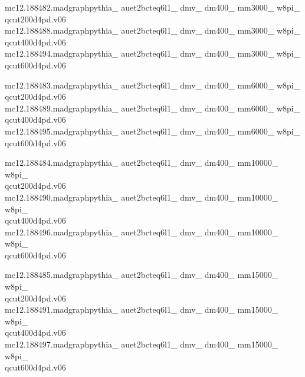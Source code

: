 mc12.188482.madgraphpythia\_ auet2bcteq6l1\_ dmv\_ dm400\_ mm3000\_ w8pi\_ \\ qcut200d4pd.v06\\
mc12.188488.madgraphpythia\_ auet2bcteq6l1\_ dmv\_ dm400\_ mm3000\_ w8pi\_ \\ qcut400d4pd.v06\\
mc12.188494.madgraphpythia\_ auet2bcteq6l1\_ dmv\_ dm400\_ mm3000\_ w8pi\_ \\ qcut600d4pd.v06

mc12.188483.madgraphpythia\_ auet2bcteq6l1\_ dmv\_ dm400\_ mm6000\_ w8pi\_ \\ qcut200d4pd.v06\\
mc12.188489.madgraphpythia\_ auet2bcteq6l1\_ dmv\_ dm400\_ mm6000\_ w8pi\_ \\ qcut400d4pd.v06\\
mc12.188495.madgraphpythia\_ auet2bcteq6l1\_ dmv\_ dm400\_ mm6000\_ w8pi\_ \\ qcut600d4pd.v06

mc12.188484.madgraphpythia\_ auet2bcteq6l1\_ dmv\_ dm400\_ mm10000\_ w8pi\_ \\ qcut200d4pd.v06\\
mc12.188490.madgraphpythia\_ auet2bcteq6l1\_ dmv\_ dm400\_ mm10000\_ w8pi\_ \\ qcut400d4pd.v06\\
mc12.188496.madgraphpythia\_ auet2bcteq6l1\_ dmv\_ dm400\_ mm10000\_ w8pi\_ \\ qcut600d4pd.v06

mc12.188485.madgraphpythia\_ auet2bcteq6l1\_ dmv\_ dm400\_ mm15000\_ w8pi\_ \\ qcut200d4pd.v06\\
mc12.188491.madgraphpythia\_ auet2bcteq6l1\_ dmv\_ dm400\_ mm15000\_ w8pi\_ \\ qcut400d4pd.v06\\
mc12.188497.madgraphpythia\_ auet2bcteq6l1\_ dmv\_ dm400\_ mm15000\_ w8pi\_ \\ qcut600d4pd.v06